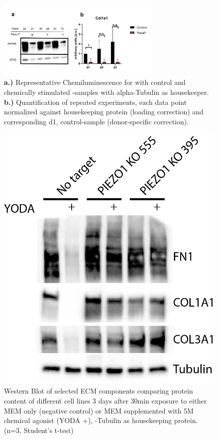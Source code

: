\begin{figure}[htbp]
	\centering
	\includegraphics[width = 0.7\textwidth]{NormalYodaExp_WesternBlot_Col1a1.png}
	\caption{
		\textbf{a.)} Representative Chemiluminescence for \colone with control and chemically stimulated \Piezo{}-samples with alpha-Tubulin as housekeeper.
		\textbf{b.)} Quantification of repeated experiments, each data point normalized against housekeeping protein (loading correction) and corresponding d1, control-sample (donor-specific correction).}
	\label{fig:Yoda_Norm_WB}
\end{figure}

\begin{figure}
	\centering
	\includegraphics[width=0.7\linewidth]{Uli_Blot_KO.png}
	\caption{Western Blot of selected ECM components comparing protein content of different cell lines 3 days after 30min exposure to either MEM\textalpha{} only (negative control) or MEM\textalpha{} supplemented with 5\textmu{}M chemical \Piezo{} agonist (YODA +), \textalpha{}-Tubulin as housekeeping protein. (n=3, Student's t-test)
	}
	\label{pic:UliBlot}
\end{figure}

